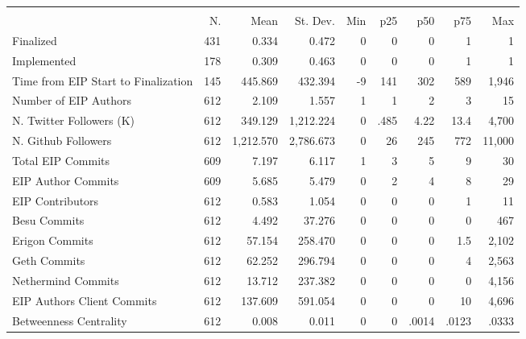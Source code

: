 {
\def\sym#1{\ifmmode^{#1}\else\(^{#1}\)\fi}
\begin{tabular}{l*{1}{rrrrrrrr}}
\hline\hline
                    &\multicolumn{8}{c}{}                                                                                   \\
                    &          N.&        Mean&    St. Dev.&         Min&         p25&         p50&         p75&         Max\\
\hline
Finalized           &         431&       0.334&       0.472&           0&           0&           0&           1&           1\\
Implemented         &         178&       0.309&       0.463&           0&           0&           0&           1&           1\\
Time from EIP Start to Finalization&         145&     445.869&     432.394&          -9&         141&         302&         589&       1,946\\
Number of EIP Authors&         612&       2.109&       1.557&           1&           1&           2&           3&          15\\
N. Twitter Followers (K)&         612&     349.129&   1,212.224&           0&        .485&        4.22&        13.4&       4,700\\
N. Github Followers &         612&   1,212.570&   2,786.673&           0&          26&         245&         772&      11,000\\
Total EIP Commits   &         609&       7.197&       6.117&           1&           3&           5&           9&          30\\
EIP Author Commits  &         609&       5.685&       5.479&           0&           2&           4&           8&          29\\
EIP Contributors    &         612&       0.583&       1.054&           0&           0&           0&           1&          11\\
Besu Commits        &         612&       4.492&      37.276&           0&           0&           0&           0&         467\\
Erigon Commits      &         612&      57.154&     258.470&           0&           0&           0&         1.5&       2,102\\
Geth Commits        &         612&      62.252&     296.794&           0&           0&           0&           4&       2,563\\
Nethermind Commits  &         612&      13.712&     237.382&           0&           0&           0&           0&       4,156\\
EIP Authors Client Commits&         612&     137.609&     591.054&           0&           0&           0&          10&       4,696\\
Betweenness Centrality&         612&       0.008&       0.011&           0&           0&       .0014&       .0123&       .0333\\
\hline\hline
\end{tabular}
}
